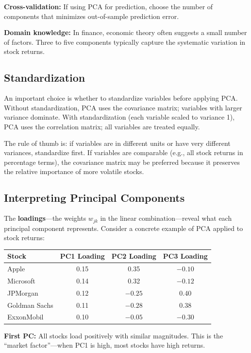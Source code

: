 \documentclass[11pt,a4paper]{article}
\newcommand{\keyword}[1]{\textbf{\textcolor{AccentOrange}{#1}}}
\begin{document}
\textbf{Cross-validation:} If using PCA for prediction, choose the number of components that minimizes out-of-sample prediction error.

\textbf{Domain knowledge:} In finance, economic theory often suggests a small number of factors. Three to five components typically capture the systematic variation in stock returns.

\subsection{Standardization}

An important choice is whether to standardize variables before applying PCA. Without standardization, PCA uses the covariance matrix; variables with larger variance dominate. With standardization (each variable scaled to variance 1), PCA uses the correlation matrix; all variables are treated equally.

The rule of thumb is: if variables are in different units or have very different variances, standardize first. If variables are comparable (e.g., all stock returns in percentage terms), the covariance matrix may be preferred because it preserves the relative importance of more volatile stocks.

\subsection{Interpreting Principal Components}

The \keyword{loadings}---the weights $w_{jk}$ in the linear combination---reveal what each principal component represents. Consider a concrete example of PCA applied to stock returns:

\begin{center}
\begin{tabular}{lccc}
\toprule
\textbf{Stock} & \textbf{PC1 Loading} & \textbf{PC2 Loading} & \textbf{PC3 Loading} \\
\midrule
Apple & 0.15 & 0.35 & $-0.10$ \\
Microsoft & 0.14 & 0.32 & $-0.12$ \\
JPMorgan & 0.12 & $-0.25$ & 0.40 \\
Goldman Sachs & 0.11 & $-0.28$ & 0.38 \\
ExxonMobil & 0.10 & $-0.05$ & $-0.30$ \\
\bottomrule
\end{tabular}
\end{center}

\textbf{First PC:} All stocks load positively with similar magnitudes. This is the ``market factor''---when PC1 is high, most stocks have high returns.
\end{document}
